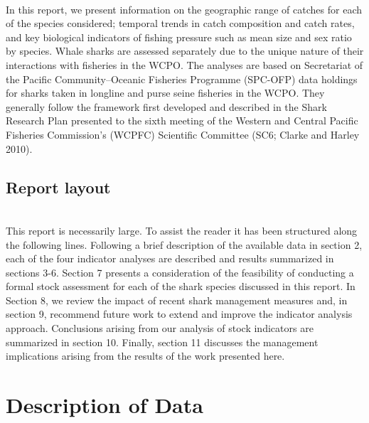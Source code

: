 \documentclass[12pt]{SCreport}
\begin{document}
\\
In this report, we present information on the geographic range of catches for each of the species considered; temporal trends in catch composition and catch rates, and key biological indicators of fishing pressure such as mean size and sex ratio by species. Whale sharks are assessed separately due to the unique nature of their interactions with fisheries in the WCPO. The analyses are based on Secretariat of the Pacific Community--Oceanic Fisheries Programme (SPC-OFP) data holdings for sharks taken in longline and purse seine fisheries in the WCPO.  They generally follow the framework first developed and described in the Shark Research Plan presented to the sixth meeting of the Western and Central Pacific Fisheries Commission's (WCPFC) Scientific Committee (SC6; Clarke and Harley 2010). 

\subsection{Report layout}
\\
This report is necessarily large. To assist the reader it has been structured along the following lines.
Following a brief description of the available data in section 2, each of the four indicator analyses
are described and results summarized in sections 3-6. Section 7 presents a consideration of the
feasibility of conducting a formal stock assessment for each of the shark species discussed in this
report. In Section 8, we review the impact of recent shark management measures and, in section 9,
recommend future work to extend and improve the indicator analysis approach. Conclusions arising
from our analysis of stock indicators are summarized in section 10. Finally, section 11 discusses
the management implications arising from the results of the work presented here.

\section{Description of Data}
\end{document}
